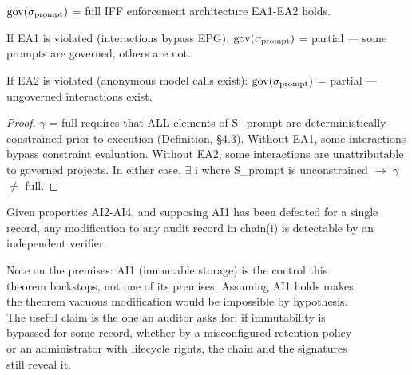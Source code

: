 \begin{cthm}
$\operatorname{gov}(\sigma_{\mathrm{prompt}})$ = full IFF enforcement architecture EA1-EA2 holds.

If EA1 is violated (interactions bypass EPG): $\operatorname{gov}(\sigma_{\mathrm{prompt}})$ = partial --- some prompts are governed, others are not.

If EA2 is violated (anonymous model calls exist): $\operatorname{gov}(\sigma_{\mathrm{prompt}})$ = partial --- ungoverned interactions exist.

\end{cthm}

\begin{proof}
$\gamma$ = full requires that ALL elements of S\_\allowbreak{}prompt are deterministically constrained prior to execution (Definition, \S{}4.3).
Without EA1, some interactions bypass constraint evaluation.
Without EA2, some interactions are unattributable to governed projects.
In either case, $\exists$ i where S\_\allowbreak{}prompt is unconstrained $\to$ $\gamma$ $\neq$ full.

\end{proof}


\begin{cthm}
Given properties AI2-AI4, and supposing AI1 has been defeated for a single record, any modification to any audit record in chain(i) is detectable by an independent verifier.

\begin{claddisp}
Note on the premises: AI1 (immutable storage) is the control this\\
theorem backstops, not one of its premises. Assuming AI1 holds makes\\
the theorem vacuous \textemdash{} modification would be impossible by hypothesis.\\
The useful claim is the one an auditor asks for: if immutability is\\
bypassed for some record, whether by a misconfigured retention policy\\
or an administrator with lifecycle rights, the chain and the signatures\\
still reveal it.\\
\end{claddisp}
\end{cthm}

